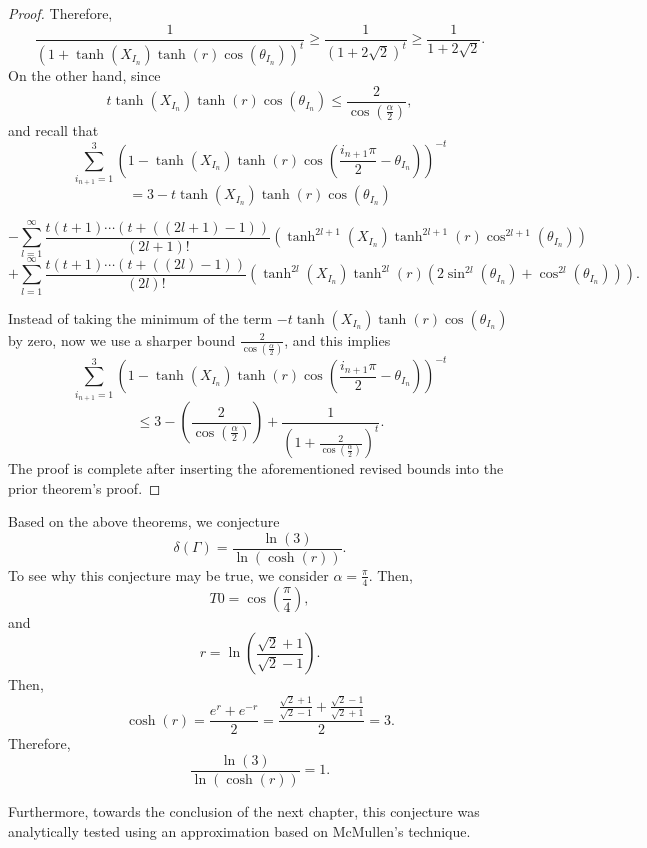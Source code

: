 \documentclass[12pt,oneside]{sfsuthesis}
\theoremstyle{plain} %
\theoremstyle{definition}  %
\theoremstyle{remark}  %
\theoremstyle{plain}
\begin{document}
{\begin{proof}
Therefore,
$$
\frac{1}{\left(1+\tanh\left(X_{I_n}\right)\tanh\left(r\right)\cos\left(\theta_{I_n}\right)\right)^t}\geq \frac{1}{\left(1+2\sqrt{2}\right)^t}\geq \frac{1}{1+2\sqrt{2}}.
$$
On the other hand, since 
$$
t\tanh\left(X_{I_n} \right)\tanh\left(r\right)\cos\left(\theta_{I_n}\right)\leq \frac{2}{\cos\left(\frac{\alpha}{2}\right)},
$$
and recall that 
$$
\sum_{i_{n+1}=1}^{3}\left(1-\tanh\left(X_{I_n}\right)\tanh\left(r\right)\cos\left(\frac{i_{n+1}\pi}{2}-\theta_{I_{n}}\right)\right)^{-t}
$$
$$
=3-t\tanh\left(X_{I_n} \right)\tanh\left(r\right)\cos\left(\theta_{I_n}\right)
$$
\begin{small}
$$
-\sum_{l=1}^{\infty}\frac{t\left(t+1\right)\cdots\left(t+\left((2l+1)-1\right)\right)}{\left(2l+1\right)!}
\left( 
\tanh^{2l+1}\left(X_{I_n}\right)\tanh^{2l+1}\left(r\right)\cos^{2l+1}\left(\theta_{I_n}\right)
\right)
$$
$$
+\sum_{l=1}^{\infty}\frac{t\left(t+1\right)\cdots\left(t+\left((2l)-1\right)\right)}{\left(2l\right)!}
\left( 
\tanh^{2l}\left(X_{I_n}\right)\tanh^{2l}\left(r\right)\left(2\sin^{2l}\left(\theta_{I_n}\right)+\cos^{2l}\left(\theta_{I_n}\right)\right)
\right).
$$
\end{small}
Instead of taking the minimum of the term $-t\tanh\left(X_{I_n} \right)\tanh\left(r\right)\cos\left(\theta_{I_n}\right)$ by zero, now we use a sharper bound $\frac{2}{\cos\left(\frac{\alpha}{2}\right)}$, and this implies 
$$
\sum_{i_{n+1}=1}^{3}\left(1-\tanh\left(X_{I_n}\right)\tanh\left(r\right)\cos\left(\frac{i_{n+1}\pi}{2}-\theta_{I_{n}}\right)\right)^{-t}
$$
$$
\leq 3-\left(\frac{2}{\cos\left(\frac{\alpha}{2}\right)}\right)+\frac{1}{\left(
1+\frac{2}{\cos\left(\frac{\alpha}{2}\right)}
\right)^t}.
$$
The proof is complete after inserting the aforementioned revised bounds into the prior theorem's proof.
\end{proof}



Based on the above theorems, we conjecture
$$
\delta\left(\Gamma\right)=\frac{\ln\left(3\right)}{\ln\left(\cosh\left(r\right)\right)}.
$$
To see why this conjecture may be true, we consider $\alpha=\frac{\pi}{4}$. Then, 
$$
T0=\cos\left(\frac{\pi}{4}\right),
$$
and 
$$
r=\ln\left(\frac{\sqrt{2}+1}{\sqrt{2}-1}\right).
$$
Then, 
$$
\cosh\left(r\right)=\frac{e^r+e^{-r}}{2}=\frac{\frac{\sqrt{2}+1}{\sqrt{2}-1}+\frac{\sqrt{2}-1}{\sqrt{2}+1}}{2}=3.
$$
Therefore,
$$
\frac{\ln\left(3\right)}{\ln\left(\cosh\left(r\right)\right)}=1.
$$

Furthermore, towards the conclusion of the next chapter, this conjecture was analytically tested using an approximation based on McMullen's technique.


}
\end{document}

